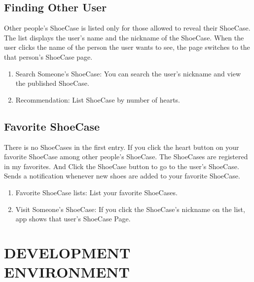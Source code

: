 \documentclass[conference]{IEEEtran}
\begin{document}
\subsection{Finding Other User}

Other people's ShoeCase is listed only for those allowed to reveal their ShoeCase. The list displays the user's name and the nickname of the ShoeCase. When the user clicks the name of the person the user wants to see, the page switches to the that person's ShoeCase page.
\\
\begin{enumerate}
	\item Search Someone's ShoeCase: You can search the user's nickname and view the published ShoeCase.
\\
	\item Recommendation: List ShoeCase by number of hearts. 
\\
\end{enumerate}

\subsection{Favorite ShoeCase}

There is no ShoeCases in the first entry. If you click the heart button on your favorite ShoeCase among other people's ShoeCase. The ShoeCases are registered in my favorites. And Click the ShoeCase button to go to the user's ShoeCase. Sends a notification whenever new shoes are added to your favorite ShoeCase. 
\\
\begin{enumerate}
	\item Favorite ShoeCase lists: List your favorite ShoeCases.
	\\
	\item Visit Someone's ShoeCase: If you click the ShoeCase's nickname on the list, app shows that user's ShoeCase Page. 
\\
\end{enumerate}

\section{DEVELOPMENT ENVIRONMENT}
\end{document}
